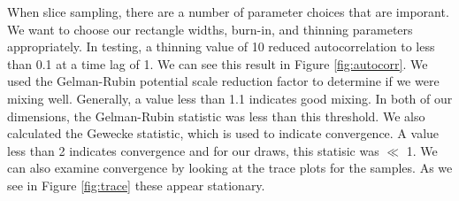 \documentclass{article} %
\begin{document}
When slice sampling, there are a number of parameter choices that are imporant. We want to choose our rectangle widths, burn-in, and thinning parameters appropriately. In testing, a thinning value of 10 reduced autocorrelation to less than 0.1 at a time lag of 1. We can see this result in Figure \ref{fig:autocorr}. We used the Gelman-Rubin potential scale reduction factor \cite{Gelman-Rubin} to determine if we were mixing well. Generally, a value less than 1.1 indicates good mixing. In both of our dimensions, the Gelman-Rubin statistic was less than this threshold. We also calculated the Gewecke statistic, which is used to indicate convergence. A value less than 2 indicates convergence and for our draws, this statisic was $\ll$ 1. We can also examine convergence by looking at the trace plots for the samples. As we see in Figure \ref{fig:trace} these appear stationary.
\end{document}
